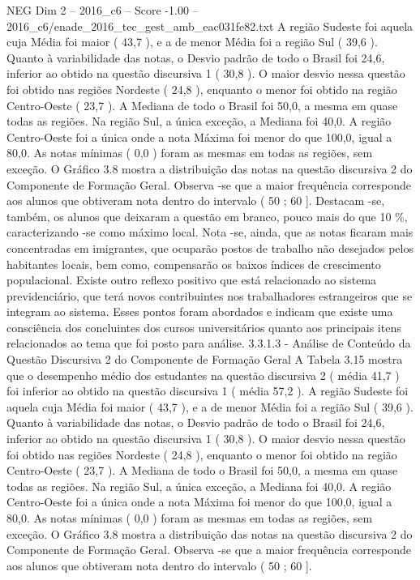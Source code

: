 \begin{textsample}{NEG Dim 2 – 2016\_c6 – Score -1.00 – 2016\_c6/enade\_2016\_tec\_gest\_amb\_eac031fe82.txt}
A região Sudeste foi aquela cuja Média foi maior ( 43,7 ), e a de menor Média foi a região Sul ( 39,6 ).
Quanto à variabilidade das notas, o Desvio padrão de todo o Brasil foi 24,6, inferior ao obtido na questão discursiva 1 ( 30,8 ).
O maior desvio nessa questão foi obtido nas regiões Nordeste ( 24,8 ), enquanto o menor foi obtido na região Centro-Oeste ( 23,7 ).
A Mediana de todo o Brasil foi 50,0, a mesma em quase todas as regiões.
Na região Sul, a única exceção, a Mediana foi 40,0.
A região Centro-Oeste foi a única onde a nota Máxima foi menor do que 100,0, igual a 80,0.
As notas mínimas ( 0,0 ) foram as mesmas em todas as regiões, sem exceção.
O Gráfico 3.8 mostra a distribuição das notas na questão discursiva 2 do Componente de Formação Geral.
Observa -se que a maior frequência corresponde aos alunos que obtiveram nota dentro do intervalo ( 50 ; 60 ].
Destacam -se, também, os alunos que deixaram a questão em branco, pouco mais do que 10 \%, caracterizando -se como máximo local.
Nota -se, ainda, que as notas ficaram mais concentradas em imigrantes, que ocuparão postos de trabalho não desejados pelos habitantes locais, bem como, compensarão os baixos índices de crescimento populacional.
Existe outro reflexo positivo que está relacionado ao sistema previdenciário, que terá novos contribuintes nos trabalhadores estrangeiros que se integram ao sistema.
Esses pontos foram abordados e indicam que existe uma consciência dos concluintes dos cursos universitários quanto aos principais itens relacionados ao tema que foi posto para análise. 3.3.1.3 - Análise de Conteúdo da Questão Discursiva 2 do Componente de Formação Geral A Tabela 3.15 mostra que o desempenho médio dos estudantes na questão discursiva 2 ( média 41,7 ) foi inferior ao obtido na questão discursiva 1 ( média 57,2 ).
A região Sudeste foi aquela cuja Média foi maior ( 43,7 ), e a de menor Média foi a região Sul ( 39,6 ).
Quanto à variabilidade das notas, o Desvio padrão de todo o Brasil foi 24,6, inferior ao obtido na questão discursiva 1 ( 30,8 ).
O maior desvio nessa questão foi obtido nas regiões Nordeste ( 24,8 ), enquanto o menor foi obtido na região Centro-Oeste ( 23,7 ).
A Mediana de todo o Brasil foi 50,0, a mesma em quase todas as regiões.
Na região Sul, a única exceção, a Mediana foi 40,0.
A região Centro-Oeste foi a única onde a nota Máxima foi menor do que 100,0, igual a 80,0.
As notas mínimas ( 0,0 ) foram as mesmas em todas as regiões, sem exceção.
O Gráfico 3.8 mostra a distribuição das notas na questão discursiva 2 do Componente de Formação Geral.
Observa -se que a maior frequência corresponde aos alunos que obtiveram nota dentro do intervalo ( 50 ; 60 ].

\end{textsample}
